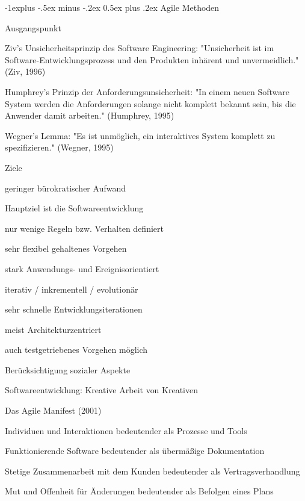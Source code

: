 \documentclass[a4paper]{article}
\makeatletter
\renewcommand{\subsection}{\@startsection{subsection}{2}{0mm}%
                                {-1explus -.5ex minus -.2ex}%
                                {0.5ex plus .2ex}%
                                {\normalfont\normalsize\bfseries}}
\makeatother
\begin{document}
\begin{multicols}{3}
  \subsection{Agile Methoden}
  \begin{itemize*}
    \item Ausgangspunkt
          \begin{itemize*}
            \item Ziv's Unsicherheitsprinzip des Software Engineering:  "Unsicherheit ist im Software-Entwicklungsprozess und den Produkten inhärent und unvermeidlich." (Ziv, 1996)
            \item Humphrey's Prinzip der Anforderungsunsicherheit: "In einem neuen Software System werden die Anforderungen solange nicht komplett bekannt sein, bis die Anwender damit arbeiten." (Humphrey, 1995)
            \item Wegner's Lemma: "Es ist unmöglich, ein interaktives System komplett zu spezifizieren." (Wegner, 1995)
          \end{itemize*}
    \item Ziele
          \begin{itemize*}
            \item geringer bürokratischer Aufwand
            \item Hauptziel ist die Softwareentwicklung
            \item nur wenige Regeln bzw. Verhalten definiert
            \item sehr flexibel gehaltenes Vorgehen
            \item stark Anwendungs- und Ereignisorientiert
            \item iterativ / inkrementell / evolutionär
            \item sehr schnelle Entwicklungsiterationen
            \item meist Architekturzentriert
            \item auch testgetriebenes Vorgehen möglich
            \item Berücksichtigung sozialer Aspekte
            \item Softwareentwicklung: Kreative Arbeit von Kreativen
          \end{itemize*}
  \end{itemize*}

  Das Agile Manifest (2001)
  \begin{itemize*}
    \item Individuen und Interaktionen bedeutender als Prozesse und Tools
    \item Funktionierende Software bedeutender als übermäßige Dokumentation
    \item Stetige Zusammenarbeit mit dem Kunden bedeutender als Vertragsverhandlung
    \item Mut und Offenheit für Änderungen bedeutender als Befolgen eines Plans
  \end{itemize*}


\end{multicols}
\end{document}
